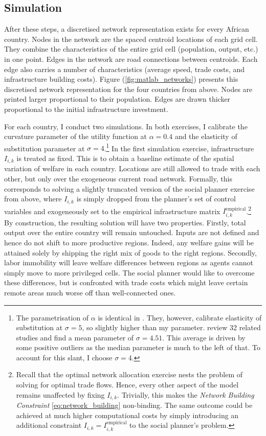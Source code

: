 \documentclass[11pt, oneside]{article}   	%
\let\oldref\ref
\renewcommand{\ref}[1]{(\oldref{#1})}
\begin{document}
\subsection{Simulation}

After these steps, a discretised network representation exists for every African country. Nodes in the network are the spaced centroid locations of each grid cell. They combine the characteristics of the entire grid cell (population, output, etc.) in one point. Edges in the network are road connections between centroids. Each edge also carries a number of characteristics (average speed, trade costs, and infrastructure building costs). Figure \ref{fig:matlab_networks} presents this discretised network representation for the four countries from above. Nodes are printed larger proportional to their population. Edges are drawn thicker proportional to the initial infrastructure investment.

For each country, I conduct two simulations. In both exercises, I calibrate the curvature parameter of the utility function at $\alpha = 0.4$ and the elasticity of substitution parameter at $\sigma=4$.\footnote{The parametrisation of $\alpha$ is identical in \cite{fajgelbaum_optimal_2017}. They, however, calibrate elasticity of substitution at $\sigma=5$, so slightly higher than my parameter. \cite{Head_GravityEquationsWorkhorse_2014} review 32 related studies and find a mean parameter of $\sigma=4.51$. This average is driven by some positive outliers as the median parameter is much to the left of that. To account for this slant, I choose $\sigma=4$.} In the first simulation exercise, infrastructure $I_{i,k}$ is treated as fixed. This is to obtain a baseline estimate of the spatial variation of welfare in each country. Locations are still allowed to trade with each other, but only over the exogeneous current road network. Formally, this corresponds to solving a slightly truncated version of the social planner exercise from above, where $I_{i,k}$ is simply dropped from the planner's set of control variables and exogeneously set to the empirical infrastructure matrix $I_{i,k}^{\textrm{empirical}}$.\footnote{Recall that the optimal network allocation exercise nests the problem of solving for optimal trade flows. Hence, every other aspect of the model remains unaffected by fixing $I_{i,k}$. Trivially, this makes the \emph{Network Building Constraint} \eqref{eq:network_building} non-binding. The same outcome could be achieved at much higher computational costs by simply introducing an additional constraint $I_{i,k} = I_{i,k}^{\textrm{empirical}}$ to the social planner's problem.} By construction, the resulting solution will have two properties. Firstly, total output over the entire country will remain untouched. Inputs are not defined and hence do not shift to more productive regions. Indeed, any welfare gains will be attained solely by shipping the right mix of goods to the right regions. Secondly, labor immobility will leave welfare differences between regions as agents cannot simply move to more privileged cells. The social planner would like to overcome these differences, but is confronted with trade costs which might leave certain remote areas much worse off than well-connected ones.
\end{document}
